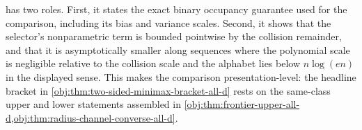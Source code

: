  has two roles. First, it states the exact binary occupancy guarantee used for the comparison, including its bias and variance scales. Second, it shows that the selector's nonparametric term is bounded pointwise by the collision remainder, and that it is asymptotically smaller along sequences where the polynomial scale is negligible relative to the collision scale and the alphabet lies below \(n\log(en)\) in the displayed sense. This makes the comparison presentation-level: the headline bracket in \cref{obj:thm:two-sided-minimax-bracket-all-d} rests on the same-class upper and lower statements assembled in \cref{obj:thm:frontier-upper-all-d,obj:thm:radius-channel-converse-all-d}.
